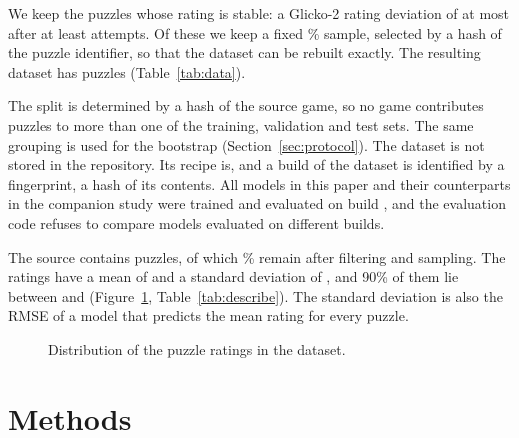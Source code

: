 \documentclass[11pt]{article}
\begin{document}
We keep the puzzles whose rating is stable: a Glicko-2 rating deviation of at
most  after at least
 attempts. Of these we keep a fixed
\% sample, selected by a hash of the puzzle
identifier, so that the dataset can be rebuilt exactly. The resulting dataset
has  puzzles (Table~\ref{tab:data}).

The split is determined by a hash of the source game, so no game contributes
puzzles to more than one of the training, validation and test sets. The same
grouping is used for the bootstrap (Section~\ref{sec:protocol}). The dataset
is not stored in the repository. Its recipe is, and a build of the dataset is
identified by a fingerprint, a hash of its contents. All models in this
paper and their counterparts in the companion study were trained and
evaluated on build , and the evaluation code refuses to
compare models evaluated on different builds.

\begin{table}[htbp]\centering\small
{}
\caption{Dataset statistics by split.}
\label{tab:data}
\end{table}

\iflook
The source contains  puzzles, of which
\% remain after filtering and sampling. The ratings
have a mean of  and a standard deviation of , and
90\% of them lie between  and 
(Figure~\ref{fig:label}, Table~\ref{tab:describe}). The standard deviation is
also the RMSE of a model that predicts the mean rating for every puzzle.

\begin{figure}[htbp]\centering
{}
\caption{Distribution of the puzzle ratings in the dataset.}
\label{fig:label}
\end{figure}

\begin{table}[htbp]\centering\small
{}
\caption{Summary statistics of selected variables over the whole dataset:
the mean, five quantiles, the minimum and the maximum. The solution length is
listed for reference and is not an input.}
\label{tab:describe}
\end{table}
\fi

\section{Methods}
\label{sec:methods}
\end{document}
